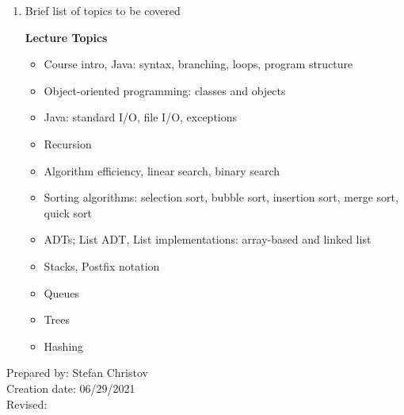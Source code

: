 \begin{enumerate}[1.]
\item Brief list of topics to be covered\\
  {\bfseries
    Lecture Topics
    \begin{itemize}
      \item Course intro, Java: syntax, branching, loops, program structure
      \item Object-oriented programming: classes and objects
      \item Java: standard I/O,  file I/O, exceptions
      \item Recursion
      \item Algorithm efficiency, linear search, binary search
      \item Sorting algorithms: selection sort, bubble sort, insertion sort, merge sort, quick sort
      \item ADTs; List ADT, List implementations: array-based and linked list
      \item Stacks, Postfix notation
      \item Queues
      \item Trees
      \item Hashing
    \end{itemize}
  }

\end{enumerate}

\noindent Prepared by: Stefan Christov\\
\noindent Creation date: 06/29/2021\\
\noindent Revised:\\
